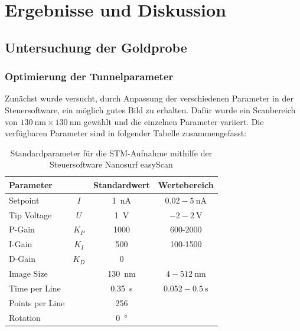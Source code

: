 \documentclass[a4paper,twoside,final]{article}
\begin{document}
\section{Ergebnisse und Diskussion}\label{sec:ErgebnisseUndDiskussion}
\subsection{Untersuchung der Goldprobe}
\subsubsection{Optimierung der Tunnelparameter}
Zunächst wurde versucht, durch Anpassung der verschiedenen Parameter in der Steuersoftware, ein möglich gutes Bild zu erhalten. Dafür wurde ein Scanbereich von $\SI{130}{\nano\metre} \times \SI{130}{\nano\metre}$ gewählt und die einzelnen Parameter variiert.
Die verfügbaren Parameter sind in folgender Tabelle zusammengefasst:
\begin{table}[ht]
	\centering
	\caption{Standardparameter für die STM-Aufnahme mithilfe der Steuersoftware Nanosurf easyScan}
	\label{tab:Parameter}
  \begin{tabular}{l c c c}
   \toprule
   Parameter   &       & Standardwert          & Wertebereich\\
   \midrule
   Setpoint    & $I$   & \SI{1}{\nano\ampere}  & $0.02-\SI{5}{\nano\ampere}$\\
   Tip Voltage & $U$   & \SI{1}{\volt}         & $-2 - \SI{2}{\volt}$\\
   P-Gain      & $K_P$ & 1000                  & 600-2000\\
   I-Gain      & $K_I$ & 500                   & 100-1500\\
   D-Gain      & $K_D$ & 0                     & \\
   Image Size  &       & \SI{130}{\nano\metre} & $4-\SI{512}{\nano\metre}$\\
   Time per Line &     & \SI{0.35}{\second}    & $0.052 - \SI{0.5}{\second}$\\
   Points per Line &   & 256                   &\\
   Rotation    &       & \SI{0}{\degree}       &\\ \bottomrule
  \end{tabular}
\end{table}
\end{document}
